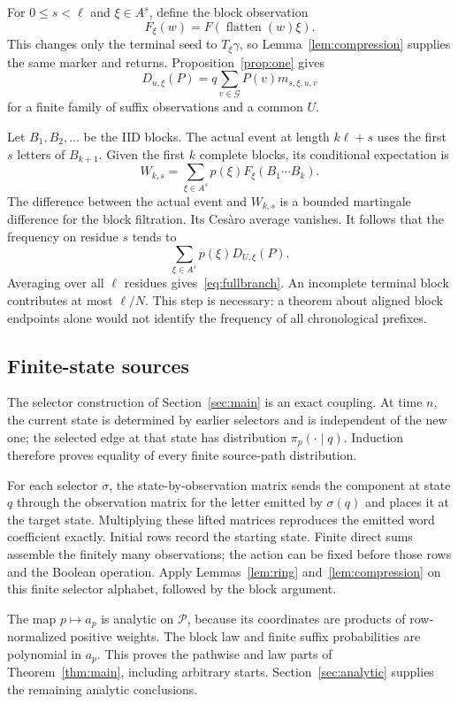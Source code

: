 \documentclass[11pt]{article}
\theoremstyle{definition}
\theoremstyle{remark}
\newcommand{\Gap}{\mathcal G}
\begin{document}
For $0\leq s<\ell$ and $\xi\in A^s$, define the block observation
\[
 F_\xi(w)=F(\operatorname{flatten}(w)\xi).
\]
This changes only the terminal seed to $T_\xi\gamma$, so Lemma~\ref{lem:compression} supplies the same marker and returns. Proposition~\ref{prop:one} gives
\[
 D_{u,\xi}(P)=q\sum_{v\in\Gap}P(v)m_{s,\xi,u,v}
\]
for a finite family of suffix observations and a common $U$.

Let $B_1,B_2,\ldots$ be the IID blocks. The actual event at length $k\ell+s$ uses the first $s$ letters of $B_{k+1}$. Given the first $k$ complete blocks, its conditional expectation is
\[
 W_{k,s}=\sum_{\xi\in A^s}p(\xi)F_\xi(B_1\cdots B_k).
\]
The difference between the actual event and $W_{k,s}$ is a bounded martingale difference for the block filtration. Its Ces\`aro average vanishes. It follows that the frequency on residue $s$ tends to
\[
 \sum_{\xi\in A^s}p(\xi)D_{U,\xi}(P).
\]
Averaging over all $\ell$ residues gives~\eqref{eq:fullbranch}. An incomplete terminal block contributes at most $\ell/N$. This step is necessary: a theorem about aligned block endpoints alone would not identify the frequency of all chronological prefixes.

\subsection{Finite-state sources}
The selector construction of Section~\ref{sec:main} is an exact coupling. At time $n$, the current state is determined by earlier selectors and is independent of the new one; the selected edge at that state has distribution $\pi_p(\cdot\mid q)$. Induction therefore proves equality of every finite source-path distribution.

For each selector $\sigma$, the state-by-observation matrix sends the component at state $q$ through the observation matrix for the letter emitted by $\sigma(q)$ and places it at the target state. Multiplying these lifted matrices reproduces the emitted word coefficient exactly. Initial rows record the starting state. Finite direct sums assemble the finitely many observations; the action can be fixed before those rows and the Boolean operation. Apply Lemmas~\ref{lem:ring} and~\ref{lem:compression} on this finite selector alphabet, followed by the block argument.

The map $p\mapsto a_p$ is analytic on $\mathcal P$, because its coordinates are products of row-normalized positive weights. The block law and finite suffix probabilities are polynomial in $a_p$. This proves the pathwise and law parts of Theorem~\ref{thm:main}, including arbitrary starts. Section~\ref{sec:analytic} supplies the remaining analytic conclusions.
\end{document}
